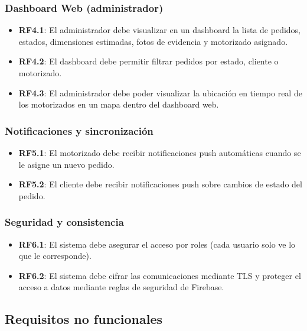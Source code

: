 \subsubsection{Dashboard Web (administrador)}

\begin{itemize}
    \item \textbf{RF4.1}: El administrador debe visualizar en un dashboard la lista de pedidos, estados, dimensiones estimadas, fotos de evidencia y motorizado asignado.
    \item \textbf{RF4.2}: El dashboard debe permitir filtrar pedidos por estado, cliente o motorizado.
    \item \textbf{RF4.3}: El administrador debe poder visualizar la ubicación en tiempo real de los motorizados en un mapa dentro del dashboard web.
\end{itemize}

\subsubsection{Notificaciones y sincronización}

\begin{itemize}
    \item \textbf{RF5.1}: El motorizado debe recibir notificaciones push automáticas cuando se le asigne un nuevo pedido.
    \item \textbf{RF5.2}: El cliente debe recibir notificaciones push sobre cambios de estado del pedido.
\end{itemize}

\subsubsection{Seguridad y consistencia}

\begin{itemize}
    \item \textbf{RF6.1}: El sistema debe asegurar el acceso por roles (cada usuario solo ve lo que le corresponde).
    \item \textbf{RF6.2}: El sistema debe cifrar las comunicaciones mediante TLS y proteger el acceso a datos mediante reglas de seguridad de Firebase.
\end{itemize}

\subsection{Requisitos no funcionales}

